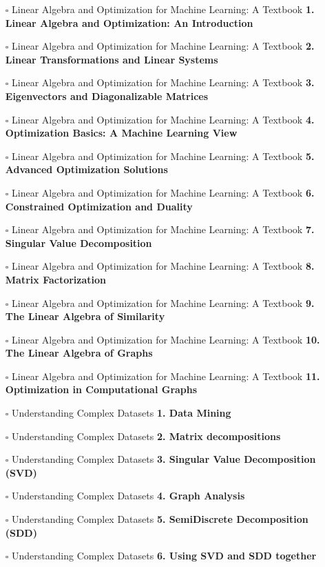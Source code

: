 \documentclass[a4, landscape, 12pt]{article}
\newcommand{\checkbox}{$\square$}%
\begin{document}
\begin{itemize}
{}
\item [\checkbox]  Linear Algebra and Optimization for Machine Learning: A Textbook \textbf{ 1. Linear Algebra and Optimization: An Introduction
}
\item [\checkbox]  Linear Algebra and Optimization for Machine Learning: A Textbook \textbf{ 2. Linear Transformations and Linear Systems
}
\item [\checkbox]  Linear Algebra and Optimization for Machine Learning: A Textbook \textbf{ 3. Eigenvectors and Diagonalizable Matrices
}
\item [\checkbox]  Linear Algebra and Optimization for Machine Learning: A Textbook \textbf{ 4. Optimization Basics: A Machine Learning View
}
\item [\checkbox]  Linear Algebra and Optimization for Machine Learning: A Textbook \textbf{ 5. Advanced Optimization Solutions
}
\item [\checkbox]  Linear Algebra and Optimization for Machine Learning: A Textbook \textbf{ 6. Constrained Optimization and Duality
}
\item [\checkbox]  Linear Algebra and Optimization for Machine Learning: A Textbook \textbf{ 7. Singular Value Decomposition
}
\item [\checkbox]  Linear Algebra and Optimization for Machine Learning: A Textbook \textbf{ 8. Matrix Factorization
}
\item [\checkbox]  Linear Algebra and Optimization for Machine Learning: A Textbook \textbf{ 9. The Linear Algebra of Similarity
}
\item [\checkbox]  Linear Algebra and Optimization for Machine Learning: A Textbook \textbf{ 10. The Linear Algebra of Graphs
}
\item [\checkbox]  Linear Algebra and Optimization for Machine Learning: A Textbook \textbf{ 11. Optimization in Computational Graphs
}
\item [\checkbox]  Understanding Complex Datasets \textbf{ 1. Data Mining
}
\item [\checkbox]  Understanding Complex Datasets \textbf{ 2. Matrix decompositions
}
\item [\checkbox]  Understanding Complex Datasets \textbf{ 3. Singular Value Decomposition (SVD)
}
\item [\checkbox]  Understanding Complex Datasets \textbf{ 4. Graph Analysis
}
\item [\checkbox]  Understanding Complex Datasets \textbf{ 5. SemiDiscrete Decomposition (SDD)
}
\item [\checkbox]  Understanding Complex Datasets \textbf{ 6. Using SVD and SDD together
}
\end{itemize}
\end{document}
